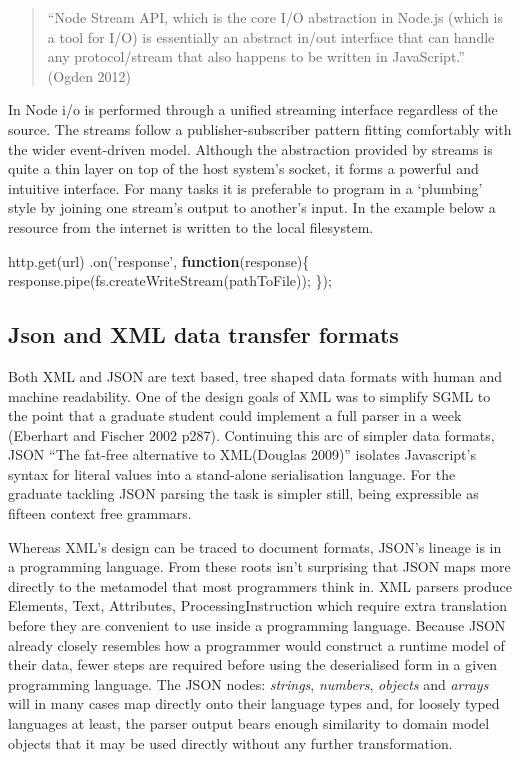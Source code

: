 \documentclass[]{article}
\newenvironment{Shaded}{}{}
\newcommand{\KeywordTok}[1]{\textcolor[rgb]{0.00,0.44,0.13}{\textbf{{#1}}}}
\newcommand{\StringTok}[1]{\textcolor[rgb]{0.25,0.44,0.63}{{#1}}}
\newcommand{\OtherTok}[1]{\textcolor[rgb]{0.00,0.44,0.13}{{#1}}}
\newcommand{\FunctionTok}[1]{\textcolor[rgb]{0.02,0.16,0.49}{{#1}}}
\newcommand{\NormalTok}[1]{{#1}}
\begin{document}
\begin{quote}
``Node Stream API, which is the core I/O abstraction in Node.js (which
is a tool for I/O) is essentially an abstract in/out interface that can
handle any protocol/stream that also happens to be written in
JavaScript.'' (Ogden 2012)
\end{quote}

In Node i/o is performed through a unified streaming interface
regardless of the source. The streams follow a publisher-subscriber
pattern fitting comfortably with the wider event-driven model. Although
the abstraction provided by streams is quite a thin layer on top of the
host system's socket, it forms a powerful and intuitive interface. For
many tasks it is preferable to program in a `plumbing' style by joining
one stream's output to another's input. In the example below a resource
from the internet is written to the local filesystem.

\begin{Shaded}
\begin{Highlighting}[]
\OtherTok{http}\NormalTok{.}\FunctionTok{get}\NormalTok{(url)}
   \NormalTok{.}\FunctionTok{on}\NormalTok{(}\StringTok{'response'}\NormalTok{, }\KeywordTok{function}\NormalTok{(response)\{}
      \OtherTok{response}\NormalTok{.}\FunctionTok{pipe}\NormalTok{(}\OtherTok{fs}\NormalTok{.}\FunctionTok{createWriteStream}\NormalTok{(pathToFile));}
   \NormalTok{\});}
\end{Highlighting}
\end{Shaded}

\subsection{Json and XML data transfer formats}

Both XML and JSON are text based, tree shaped data formats with human
and machine readability. One of the design goals of XML was to simplify
SGML to the point that a graduate student could implement a full parser
in a week (Eberhart and Fischer 2002 p287). Continuing this arc of
simpler data formats, JSON ``The fat-free alternative to XML(Douglas
2009)'' isolates Javascript's syntax for literal values into a
stand-alone serialisation language. For the graduate tackling JSON
parsing the task is simpler still, being expressible as fifteen context
free grammars.

Whereas XML's design can be traced to document formats, JSON's lineage
is in a programming language. From these roots isn't surprising that
JSON maps more directly to the metamodel that most programmers think in.
XML parsers produce Elements, Text, Attributes, ProcessingInstruction
which require extra translation before they are convenient to use inside
a programming language. Because JSON already closely resembles how a
programmer would construct a runtime model of their data, fewer steps
are required before using the deserialised form in a given programming
language. The JSON nodes: \emph{strings}, \emph{numbers}, \emph{objects}
and \emph{arrays} will in many cases map directly onto their language
types and, for loosely typed languages at least, the parser output bears
enough similarity to domain model objects that it may be used directly
without any further transformation.
\end{document}
